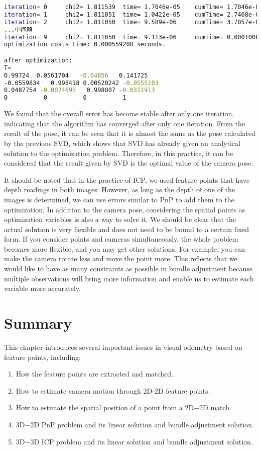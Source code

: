 \begin{lstlisting}[language=sh, caption=Terminal output:]
iteration= 0	 chi2= 1.811539	 time= 1.7046e-05	 cumTime= 1.7046e-05	 edges= 74	 schur= 0
iteration= 1	 chi2= 1.811051	 time= 1.0422e-05	 cumTime= 2.7468e-05	 edges= 74	 schur= 0
iteration= 2	 chi2= 1.811050	 time= 9.589e-06	 cumTime= 3.7057e-05	 edges= 74	 schur= 0
...中间略
iteration= 9	 chi2= 1.811050	 time= 9.113e-06	 cumTime= 0.000100604	 edges= 74	 schur= 0
optimization costs time: 0.000559208 seconds.

after optimization:
T=
0.99724  0.0561704   -0.04856   0.141725
-0.0559834   0.998418 0.00520242 -0.0555103
0.0487754 -0.0024695   0.998807 -0.0311913
0          0          0          1
\end{lstlisting}

We found that the overall error has become stable after only one iteration, indicating that the algorithm has converged after only one iteration. From the result of the pose, it can be seen that it is almost the same as the pose calculated by the previous SVD, which shows that SVD has already given an analytical solution to the optimization problem. Therefore, in this practice, it can be considered that the result given by SVD is the optimal value of the camera pose.

It should be noted that in the practice of ICP, we used feature points that have depth readings in both images. However, as long as the depth of one of the images is determined, we can use errors similar to PnP to add them to the optimization. In addition to the camera pose, considering the spatial points as optimization variables is also a way to solve it. We should be clear that the actual solution is very flexible and does not need to be bound to a certain fixed form. If you consider points and cameras simultaneously, the whole problem becomes more flexible, and you may get other solutions. For example, you can make the camera rotate less and move the point more. This reflects that we would like to have as many constraints as possible in bundle adjustment because multiple observations will bring more information and enable us to estimate each variable more accurately.

\section{Summary}
This chapter introduces several important issues in visual odometry based on feature points, including:

\begin{enumerate}
	\item How the feature points are extracted and matched.
	\item How to estimate camera motion through 2D-2D feature points.
	\item How to estimate the spatial position of a point from a 2D−2D match.
	\item 3D−2D PnP problem and its linear solution and bundle adjustment solution.
	\item 3D−3D ICP problem and its linear solution and bundle adjustment solution.
\end{enumerate}

